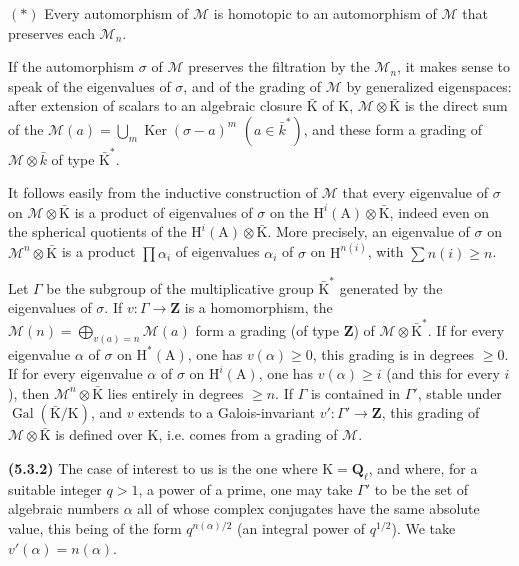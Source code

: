 \documentclass[11pt,leqno]{article}
\begin{document}
\((*)\) Every automorphism of \(\mathcal{M}\) is homotopic to an automorphism of \(\mathcal{M}\) that preserves each \(\mathcal{M}_n\).

If the automorphism \(\sigma\) of \(\mathcal{M}\) preserves the filtration by the \(\mathcal{M}_n\), it makes sense to speak of the eigenvalues of \(\sigma\), and of the grading of \(\mathcal{M}\) by generalized eigenspaces: after extension of scalars to an algebraic closure \(\bar{\mathrm{K}}\) of \(\mathrm{K}\), \(\mathcal{M}\otimes\bar{\mathrm{K}}\) is the direct sum of the \(\mathcal{M}(a)=\bigcup\limits_m\operatorname{Ker}(\sigma-a)^m\) \((a\in\bar{k}^*)\), and these form a grading of \(\mathcal{M}\otimes\bar{k}\) of type \(\bar{\mathrm{K}}^*\).

It follows easily from the inductive construction of \(\mathcal{M}\) that every eigenvalue of \(\sigma\) on \(\mathcal{M}\otimes\bar{\mathrm{K}}\) is a product of eigenvalues of \(\sigma\) on the \(\mathrm{H}^i(\mathrm{A})\otimes\bar{\mathrm{K}}\), indeed even on the spherical quotients of the \(\mathrm{H}^i(\mathrm{A})\otimes\bar{\mathrm{K}}\). More precisely, an eigenvalue of \(\sigma\) on \(\mathcal{M}^n\otimes\bar{\mathrm{K}}\) is a product \(\prod\alpha_i\) of eigenvalues \(\alpha_i\) of \(\sigma\) on \(\mathrm{H}^{n(i)}\), with \(\sum n(i)\geq n\).

Let \(\Gamma\) be the subgroup of the multiplicative group \(\bar{\mathrm{K}}^*\) generated by the eigenvalues of \(\sigma\). If \(v:\Gamma\to\mathbf{Z}\) is a homomorphism, the \(\mathcal{M}(n)=\bigoplus\limits_{v(a)=n}\mathcal{M}(a)\) form a grading (of type \(\mathbf{Z}\)) of \(\mathcal{M}\otimes\bar{\mathrm{K}}^*\). If for every eigenvalue \(\alpha\) of \(\sigma\) on \(\mathrm{H}^*(\mathrm{A})\), one has \(v(\alpha)\geq0\), this grading is in degrees \(\geq0\). If for every eigenvalue \(\alpha\) of \(\sigma\) on \(\mathrm{H}^i(\mathrm{A})\), one has \(v(\alpha)\geq i\) (and this for every \(i\)), then \(\mathcal{M}^n\otimes\bar{\mathrm{K}}\) lies entirely in degrees \(\geq n\). If \(\Gamma\) is contained in \(\Gamma'\), stable under \(\operatorname{Gal}(\bar{\mathrm{K}}/\mathrm{K})\), and \(v\) extends to a Galois-invariant \(v':\Gamma'\to\mathbf{Z}\), this grading of \(\mathcal{M}\otimes\bar{\mathrm{K}}\) is defined over \(\mathrm{K}\), i.e. comes from a grading of \(\mathcal{M}\).

\textbf{(5.3.2)} The case of interest to us is the one where \(\mathrm{K}=\mathbf{Q}_{\ell}\), and where, for a suitable integer \(q>1\), a power of a prime, one may take \(\Gamma'\) to be the set of algebraic numbers \(\alpha\) all of whose complex conjugates have the same absolute value, this being of the form \(q^{n(\alpha)/2}\) (an integral power of \(q^{1/2}\)). We take \(v'(\alpha)=n(\alpha)\).
\end{document}
